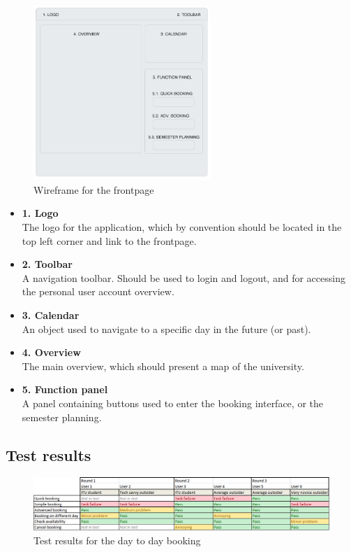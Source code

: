 \begin{figure}[htb]
\begin{center}
\leavevmode
\includegraphics[width=0.6\textwidth]{images/wireframe1}
\end{center}
\caption{Wireframe for the frontpage}
\label{fig:wireframe_frontpage}
\end{figure}

\begin{itemize}
	\item \textbf{1. Logo}\\
	The logo for the application, which by convention should be located in the top left corner and link to the frontpage. \cite{steve}
	\item \textbf{2. Toolbar}\\
	A navigation toolbar. Should be used to login and logout, and for accessing the personal user account overview.
	\item \textbf{3. Calendar}\\
	An object used to navigate to a specific day in the future (or past).
	\item \textbf{4. Overview}\\
	The main overview, which should present a map of the university.
	\item \textbf{5. Function panel}\\
	A panel containing buttons used to enter the booking interface, or the semester planning.
\end{itemize}


\subsection{Test results}
\begin{figure}[htb]
\begin{center}
\leavevmode
\includegraphics[width=1\textwidth]{images/result_day}
\end{center}
\caption{Test results for the day to day booking}
\label{fig:results_day}
\end{figure}

